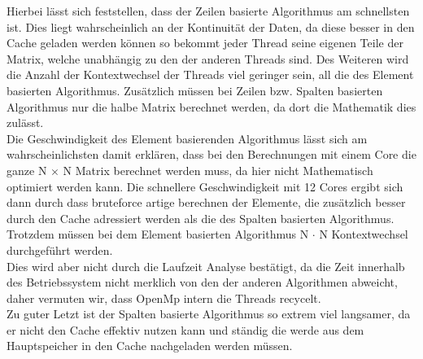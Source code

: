 \documentclass[11pt]{article}
\begin{document}
\normalsize
Hierbei lässt sich feststellen, dass der Zeilen basierte Algorithmus am schnellsten ist.
Dies liegt wahrscheinlich an der Kontinuität der Daten, da diese besser in den Cache geladen werden können
so bekommt jeder Thread seine eigenen Teile der Matrix, welche unabhängig zu den der anderen Threads sind. Des Weiteren wird die Anzahl der Kontextwechsel der Threads viel geringer sein, all die des Element basierten Algorithmus.
Zusätzlich müssen bei Zeilen bzw. Spalten basierten Algorithmus nur die halbe Matrix berechnet werden, da dort die Mathematik dies zulässt.\\
Die Geschwindigkeit des Element basierenden Algorithmus lässt sich am wahrscheinlichsten damit erklären, dass bei den Berechnungen mit einem Core die ganze N $\times$ N Matrix berechnet werden muss, da hier nicht Mathematisch optimiert werden kann. Die schnellere Geschwindigkeit mit 12 Cores ergibt sich dann durch dass bruteforce artige berechnen der Elemente, die zusätzlich besser durch den Cache adressiert werden als die des Spalten basierten Algorithmus.\\
Trotzdem müssen bei dem Element basierten Algorithmus N $\cdot$ N Kontextwechsel durchgeführt werden. \\
Dies wird aber nicht durch die Laufzeit Analyse bestätigt, da die Zeit innerhalb des Betriebssystem nicht merklich von den der anderen Algorithmen abweicht, daher vermuten wir, dass OpenMp intern die Threads recycelt.\\
Zu guter Letzt ist der Spalten basierte Algorithmus so extrem viel langsamer, da er nicht den Cache effektiv nutzen kann und ständig die werde aus dem Hauptspeicher in den Cache nachgeladen werden müssen. 
\end{document}
